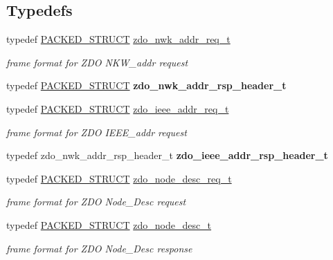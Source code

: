 \subsection*{Typedefs}
\begin{DoxyCompactItemize}
\item 
typedef \hyperlink{group___s_x_a_ga4233297bd31be5c273d4fb0758cc54d7}{P\+A\+C\+K\+E\+D\+\_\+\+S\+T\+R\+U\+CT} \hyperlink{group__zdo_gac1680800358ab1c7a6690c3a3f2628ff}{zdo\+\_\+nwk\+\_\+addr\+\_\+req\+\_\+t}
\begin{DoxyCompactList}\small\item\em frame format for Z\+DO N\+K\+W\+\_\+addr request \end{DoxyCompactList}\item 
typedef \hyperlink{group___s_x_a_ga4233297bd31be5c273d4fb0758cc54d7}{P\+A\+C\+K\+E\+D\+\_\+\+S\+T\+R\+U\+CT} {\bfseries zdo\+\_\+nwk\+\_\+addr\+\_\+rsp\+\_\+header\+\_\+t}
\item 
typedef \hyperlink{group___s_x_a_ga4233297bd31be5c273d4fb0758cc54d7}{P\+A\+C\+K\+E\+D\+\_\+\+S\+T\+R\+U\+CT} \hyperlink{group__zdo_ga750ebc1379ded82ecdd43bf07306a812}{zdo\+\_\+ieee\+\_\+addr\+\_\+req\+\_\+t}
\begin{DoxyCompactList}\small\item\em frame format for Z\+DO I\+E\+E\+E\+\_\+addr request \end{DoxyCompactList}\item 
\mbox{\label{group__zdo_ga3aaa32dc1a5568dbe64ee5e80696d2f6}} 
typedef zdo\+\_\+nwk\+\_\+addr\+\_\+rsp\+\_\+header\+\_\+t {\bfseries zdo\+\_\+ieee\+\_\+addr\+\_\+rsp\+\_\+header\+\_\+t}
\item 
typedef \hyperlink{group___s_x_a_ga4233297bd31be5c273d4fb0758cc54d7}{P\+A\+C\+K\+E\+D\+\_\+\+S\+T\+R\+U\+CT} \hyperlink{group__zdo_gac66d43595fc4f074cb4c50c1531100d5}{zdo\+\_\+node\+\_\+desc\+\_\+req\+\_\+t}
\begin{DoxyCompactList}\small\item\em frame format for Z\+DO Node\+\_\+\+Desc request \end{DoxyCompactList}\item 
typedef \hyperlink{group___s_x_a_ga4233297bd31be5c273d4fb0758cc54d7}{P\+A\+C\+K\+E\+D\+\_\+\+S\+T\+R\+U\+CT} \hyperlink{group__zdo_ga194073102dea473d1c5ac730f46d6d6d}{zdo\+\_\+node\+\_\+desc\+\_\+t}
\begin{DoxyCompactList}\small\item\em frame format for Z\+DO Node\+\_\+\+Desc response \end{DoxyCompactList}\item 

\end{DoxyCompactItemize}
